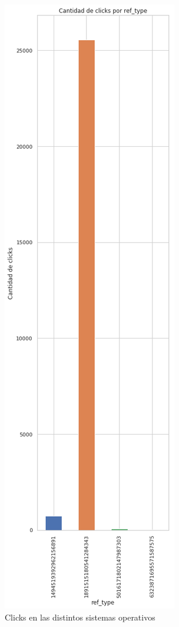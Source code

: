 \documentclass[a4paper, 12pt]{article}
\begin{document}
		\FloatBarrier
		\begin{figure}[h]
			\centering
			\includegraphics[width=\textwidth]{images/clicks/clicks_ref_type.png}
			\caption{Clicks en las distintos sistemas operativos}
		\end{figure}
		\FloatBarrier
\end{document}
